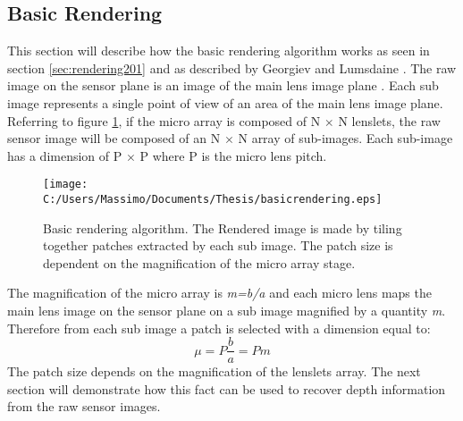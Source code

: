 \subsection{Basic Rendering}
\label{sec:basicrendering}
This section will describe how the basic rendering algorithm works as seen in section \ref{sec:rendering201} and as described by Georgiev and Lumsdaine  \cite{georgiev2010focused,lumsdaine2009focused}.
The raw image on the sensor plane is an image of the main lens image plane \cite{georgiev2010focused}. Each sub image represents a single point of view of an area of the main lens image plane. Referring to figure \ref{fig:render20b}, if the micro array is composed of N $\times$ N lenslets, the raw sensor image will be composed of an N $\times$ N array of sub-images. Each sub-image has a dimension of P $\times$ P where P is the micro lens pitch. 
\begin{figure}[H]
	\centering
	\texttt{[image: C:/Users/Massimo/Documents/Thesis/basicrendering.eps]}
	\caption{\label{fig:render20b} Basic rendering algorithm. The Rendered image is made by tiling together patches extracted by each sub image. The patch size is dependent on the magnification of the micro array stage.  }
\end{figure}
The magnification of the micro array is \textit{m=b/a} and each micro lens maps the main lens image on the sensor plane on a sub image magnified by a quantity \textit{m}. Therefore from each sub image a patch is selected with a dimension equal to:
\begin{equation}
	\label{eq:patch}
	\mu = P \dfrac{b}{a} = P m
\end{equation}
The patch size depends on the magnification of the lenslets array. The next section will demonstrate how this fact can be used to recover depth information from the raw sensor images. 
